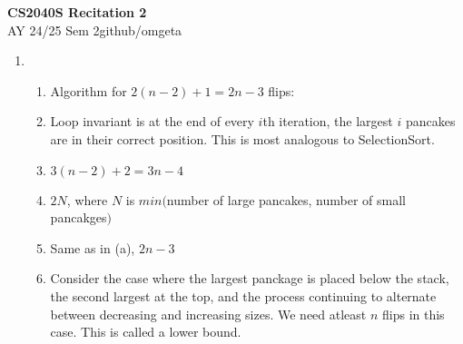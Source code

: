 \documentclass[12pt, a4paper]{article}
\newcommand{\mytitle}{CS2040S Recitation 2}
\newcommand{\myauthor}{github/omgeta}
\newcommand{\mydate}{AY 24/25 Sem 2}
\begin{document}
\raggedright
\footnotesize
\begin{center}
{\normalsize{\textbf{\mytitle}}} \\
{\footnotesize{\mydate\hspace{2pt}\textemdash\hspace{2pt}\myauthor}}
\end{center}
\begin{enumerate}[Q\arabic*.]
  \item 
    \begin{enumerate}[(\alph*.)]
      \item Algorithm for $2(n-2) + 1 = 2n-3$ flips: 

      \item Loop invariant is at the end of every $i$th iteration, the largest $i$ pancakes are in their correct position. This is most analogous to SelectionSort.

      \item $3(n-2) +2= 3n-4$

      \item $2N$, where $N$ is $min($number of large pancakes, number of small pancakges$)$ 

      \item Same as in (a), $2n-3$

      \item Consider the case where the largest panckage is placed below the stack, the second largest at the top, and the process continuing to alternate between decreasing and increasing sizes. We need atleast $n$ flips in this case. This is called a lower bound.
    \end{enumerate}
\end{enumerate}
\end{document}

